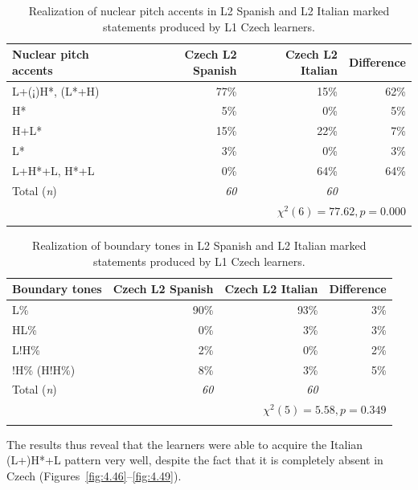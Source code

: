 \begin{table}
\begin{tabularx}{\textwidth}{Qrrr}

\lsptoprule

{Nuclear pitch accents} & {Czech L2 Spanish} & {Czech L2 Italian} & {Difference}\\
\midrule
L+(¡)H*, (L*+H) &  77\% &  15\% &  62\%\\
H* &  5\% &  0\% & 5\%\\
H+L* &  15\% &  22\% &  7\%\\
L* &  3\% &  0\% & 3\%\\
L+H*+L, H*+L &  0\% & 64\% &  64\%\\
\midrule
Total (\textit{n}) & {\itshape 60} & {\itshape 60} &  \\
\\
\lspbottomrule
\end{tabularx}

\caption{Realization of nuclear pitch accents in L2 Spanish and L2 Italian marked statements produced by L1 Czech learners.}
\label{tab:4.14}
\end{table}

\begin{table}
\begin{tabularx}{\textwidth}{Qrrr}

\lsptoprule

{Boundary tones} & {Czech L2 Spanish} & {Czech L2 Italian} & {Difference}\\
\midrule
L\% &  90\% &  93\% &  3\%\\
HL\% &  0\% & 3\% &  3\%\\
L!H\% &  2\% &  0\% & 2\%\\
!H\% (H!H\%) &  8\% &  3\% &  5\%\\
\midrule
Total (\textit{n}) & {\itshape 60} & {\itshape 60} &  \\
\\
\lspbottomrule
\end{tabularx}

\caption{Realization of boundary tones in L2 Spanish and L2 Italian marked statements produced by L1 Czech learners.}
\label{tab:4.15}
\end{table}

\begin{sloppypar}
The results thus reveal that the learners were able to acquire the Italian (L+)H*+L pattern very well, despite the fact that it is completely absent in Czech (Figures~\ref{fig:4.46}--\ref{fig:4.49}).
\end{sloppypar}

